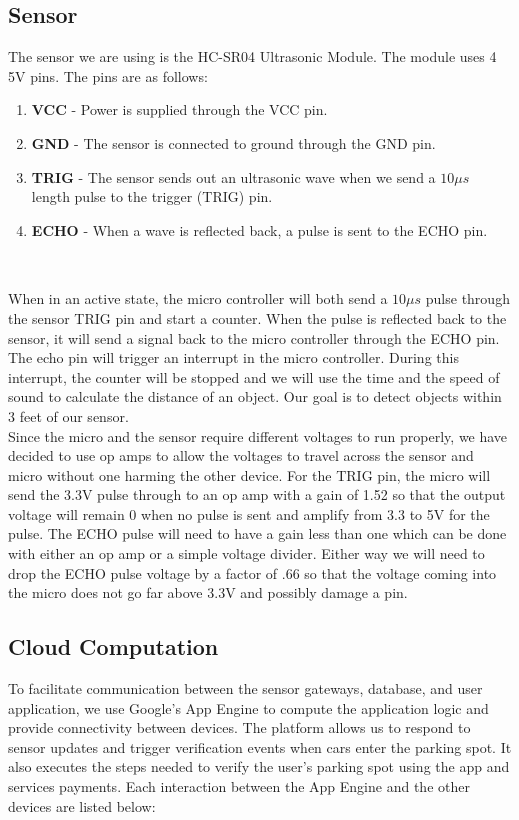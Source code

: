 \documentclass{article}
\begin{document}
\subsection{Sensor}
The sensor we are using is the HC-SR04 Ultrasonic Module. The module uses 4 5V pins. The pins are as follows:
\begin{enumerate}
\item \textbf{VCC} - Power is supplied through the VCC pin.
\item \textbf{GND} - The sensor is connected to ground through the GND pin.
\item \textbf{TRIG} - The sensor sends out an ultrasonic wave when we send a $10 \mu s$ length pulse to the trigger (TRIG) pin.
\item \textbf{ECHO} - When a wave is reflected back, a pulse is sent to the ECHO pin. \\\\
\end{enumerate}
\subsection*{} When in an active state, the micro controller will both send a $10 \mu s$ pulse through the sensor TRIG pin and start a counter. When the pulse is reflected back to the sensor, it will send a signal back to the micro controller through the ECHO pin. The echo pin will trigger an interrupt in the micro controller. During this interrupt, the counter will be stopped and we will use the time and the speed of sound to calculate the distance of an object. Our goal is to detect objects within 3 feet of our sensor. \\
Since the micro and the sensor require different voltages to run properly, we have decided to use op amps to allow the voltages to travel across the sensor and micro without one harming the other device. For the TRIG pin, the micro will send the 3.3V pulse through to an op amp with a gain of 1.52 so that the output voltage will remain 0 when no pulse is sent and amplify from 3.3 to 5V for the pulse. The ECHO pulse will need to have a gain less than one which can be done with either an op amp or a simple voltage divider. Either way we will need to drop the ECHO pulse voltage by a factor of .66 so that the voltage coming into the micro does not go far above 3.3V and possibly damage a pin.

\subsection{Cloud Computation}
To facilitate communication between the sensor gateways, database, and user application, we use Google's App Engine to compute the application logic and provide connectivity between devices. The platform allows us to respond to sensor updates and trigger verification events when cars enter the parking spot. It also executes the steps needed to verify the user's parking spot using the app and services payments. Each interaction between the App Engine and the other devices are listed below:
\end{document}
